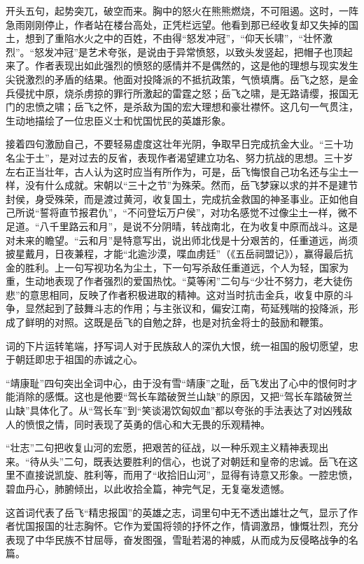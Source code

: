 \documentclass[letterpaper,10pt,english]{sphinxmanual}
\begin{document}
开头五句，起势突兀，破空而来。胸中的怒火在熊熊燃烧，不可阻遏。这时，一阵急雨刚刚停止，作者站在楼台高处，正凭栏远望。他看到那已经收复却又失掉的国土，想到了重陷水火之中的百姓，不由得“怒发冲冠”，“仰天长啸”，“壮怀激烈”。“怒发冲冠”是艺术夸张，是说由于异常愤怒，以致头发竖起，把帽子也顶起来了。作者表现出如此强烈的愤怒的感情并不是偶然的，这是他的理想与现实发生尖锐激烈的矛盾的结果。他面对投降派的不抵抗政策，气愤填膺。岳飞之怒，是金兵侵扰中原，烧杀虏掠的罪行所激起的雷霆之怒；岳飞之啸，是无路请缨，报国无门的忠愤之啸；岳飞之怀，是杀敌为国的宏大理想和豪壮襟怀。这几句一气贯注，生动地描绘了一位忠臣义士和忧国忧民的英雄形象。

接着四句激励自己，不要轻易虚度这壮年光阴，争取早日完成抗金大业。“三十功名尘于土”，是对过去的反省，表现作者渴望建立功名、努力抗战的思想。三十岁左右正当壮年，古人认为这时应当有所作为，可是，岳飞悔恨自己功名还与尘土一样，没有什么成就。宋朝以“三十之节”为殊荣。然而，岳飞梦寐以求的并不是建节封侯，身受殊荣，而是渡过黄河，收复国土，完成抗金救国的神圣事业。正如他自己所说“誓将直节报君仇”，“不问登坛万户侯”，对功名感觉不过像尘土一样，微不足道。“八千里路云和月”，是说不分阴晴，转战南北，在为收复中原而战斗。这是对未来的瞻望。“云和月”是特意写出，说出师北伐是十分艰苦的，任重道远，尚须披星戴月，日夜兼程，才能“北逾沙漠，喋血虏廷”（《五岳祠盟记》），赢得最后抗金的胜利。上一句写视功名为尘土，下一句写杀敌任重道远，个人为轻，国家为重，生动地表现了作者强烈的爱国热忱。“莫等闲”二句与“少壮不努力，老大徒伤悲”的意思相同，反映了作者积极进取的精神。这对当时抗击金兵，收复中原的斗争，显然起到了鼓舞斗志的作用；与主张议和，偏安江南，苟延残喘的投降派，形成了鲜明的对照。这既是岳飞的自勉之辞，也是对抗金将士的鼓励和鞭策。

词的下片运转笔端，抒写词人对于民族敌人的深仇大恨，统一祖国的殷切愿望，忠于朝廷即忠于祖国的赤诚之心。

“靖康耻”四句突出全词中心，由于没有雪“靖康”之耻，岳飞发出了心中的恨何时才能消除的感慨。这也是他要“驾长车踏破贺兰山缺”的原因，又把“驾长车踏破贺兰山缺”具体化了。从“驾长车”到“笑谈渴饮匈奴血”都以夸张的手法表达了对凶残敌人的愤恨之情，同时表现了英勇的信心和大无畏的乐观精神。

“壮志”二句把收复山河的宏愿，把艰苦的征战，以一种乐观主义精神表现出来。“待从头”二句，既表达要胜利的信心，也说了对朝廷和皇帝的忠诚。岳飞在这里不直接说凯旋、胜利等，而用了“收拾旧山河”，显得有诗意又形象。一腔忠愤，碧血丹心，肺腑倾出，以此收拾全篇，神完气足，无复毫发遗憾。

这首词代表了岳飞“精忠报国”的英雄之志，词里句中无不透出雄壮之气，显示了作者忧国报国的壮志胸怀。它作为爱国将领的抒怀之作，情调激昂，慷慨壮烈，充分表现了中华民族不甘屈辱，奋发图强，雪耻若渴的神威，从而成为反侵略战争的名篇。
\end{document}
